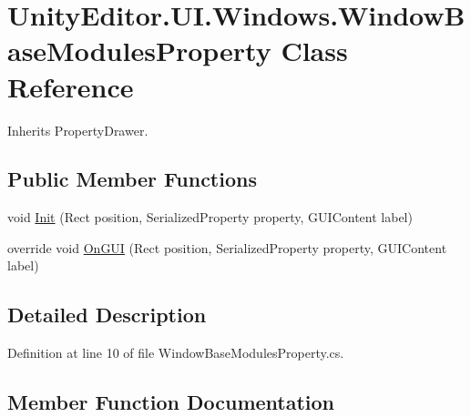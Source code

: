 \hypertarget{class_unity_editor_1_1_u_i_1_1_windows_1_1_window_base_modules_property}{}\section{Unity\+Editor.\+U\+I.\+Windows.\+Window\+Base\+Modules\+Property Class Reference}
\label{class_unity_editor_1_1_u_i_1_1_windows_1_1_window_base_modules_property}


Inherits Property\+Drawer.

\subsection*{Public Member Functions}
\begin{DoxyCompactItemize}
\item 
void \hyperlink{class_unity_editor_1_1_u_i_1_1_windows_1_1_window_base_modules_property_a1f7242a68ce08c063fef12a3c47c5d4a}{Init} (Rect position, Serialized\+Property property, G\+U\+I\+Content label)
\item 
override void \hyperlink{class_unity_editor_1_1_u_i_1_1_windows_1_1_window_base_modules_property_aae2abbe55fe885f4b07b820c84e97559}{On\+G\+U\+I} (Rect position, Serialized\+Property property, G\+U\+I\+Content label)
\end{DoxyCompactItemize}


\subsection{Detailed Description}


Definition at line 10 of file Window\+Base\+Modules\+Property.\+cs.



\subsection{Member Function Documentation}
\hypertarget{class_unity_editor_1_1_u_i_1_1_windows_1_1_window_base_modules_property_a1f7242a68ce08c063fef12a3c47c5d4a}{}
